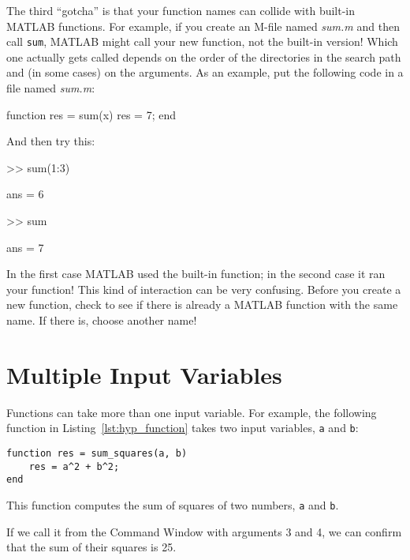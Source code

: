 The third ``gotcha'' is that your function names can collide with built-in
MATLAB functions.  For example, if you create an M-file named \emph{sum.m} and then call \lstinline{sum}, MATLAB might call your new
function, not the built-in version!  Which one actually gets called
depends on the order of the directories in the search path and
(in some cases) on the arguments.  As an example, put the following
code in a file named \emph{sum.m}:


\begin{code}
function res = sum(x)
   res = 7;
end
\end{code}

And then try this:

\begin{code}
>> sum(1:3)

ans = 6

>> sum

ans = 7
\end{code}

In the first case MATLAB used the built-in function; in the second
case it ran your function!  This kind of interaction can be very
confusing.  Before you create a new function, check to see if there is
already a MATLAB function with the same name.  If there is, choose
another name!

\section{Multiple Input Variables}
\label{hypotenuse}


Functions can take more than one input variable.
For example, the following function in Listing~\ref{lst:hyp_function} takes two input variables,
\lstinline{a} and \lstinline{b}:

\begin{lstlisting}[caption={A function that computes the sum of squares of two numbers}, label={lst:hyp_function}]
function res = sum_squares(a, b)
    res = a^2 + b^2;
end
\end{lstlisting}

This function computes the sum of squares of two numbers, \lstinline{a}
and \lstinline{b}.

If we call it from the Command Window with arguments 3 and 4, we can
confirm that the sum of their squares is 25.

